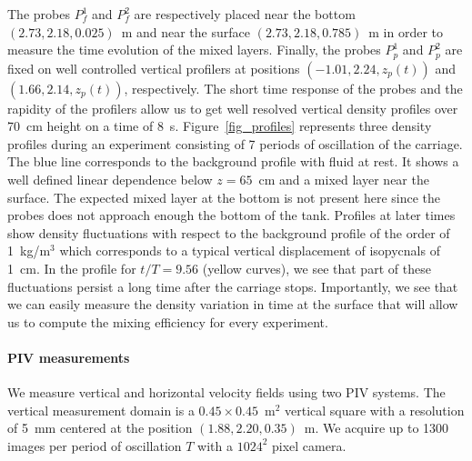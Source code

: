 \documentclass[a4paper, 12pt, times]{article}
\begin{document}
\noindent The probes $P_f^1$ and $P_f^2$ are respectively placed near the bottom
$(2.73, 2.18, 0.025)$~m and near the surface $(2.73, 2.18, 0.785)$~m in order
to measure the time evolution of the mixed layers.
%
\noindent Finally, the probes $P_p^1$ and $P_p^2$ are fixed on well controlled
vertical profilers at positions $(-1.01, 2.24, z_p(t))$ and
$(1.66, 2.14, z_p(t))$, respectively. The short time response of the probes and
the rapidity of the profilers allow us to get well resolved vertical density
profiles over 70~cm height on a time of $8$~s. Figure~\ref{fig_profiles}
represents three density profiles during an experiment consisting of 7 periods
of oscillation of the carriage. The blue line corresponds to the background
profile with fluid at rest. It shows a well defined linear dependence below  $z=65$~cm
and a mixed layer near the surface. The expected mixed layer at the bottom is not present here since the probes does not approach enough the bottom of the
tank.
%
Profiles at later times show density fluctuations with respect to the
background profile of the order of 1~kg/m$^3$ which corresponds to a
typical vertical displacement of isopycnals of 1~cm. In the profile
for $t/T = 9.56$ (yellow curves), we see that part of these fluctuations persist a long
time after the carriage stops. Importantly, we see that we can easily measure
the density variation in time at the surface that will allow us to compute
the mixing efficiency for every experiment.


\paragraph{PIV measurements}
 We measure vertical and horizontal velocity fields using two PIV
systems. The vertical measurement domain is a $0.45 \times 0.45$~m$^2$ vertical
square with a resolution of 5~mm centered at the position
$(1.88, 2.20, 0.35)$~m. We acquire up to 1300 images per period of oscillation
$T$ with a $1024^2$ pixel camera.
\end{document}
